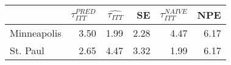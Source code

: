 
\begin{tabular}{lrrrrr}
\toprule
  & $\tau_{ITT}^{PRED}$ & $\hat{\tau_{ITT}}$ & SE & $\tau_{ITT}^{NAIVE}$ & NPE\\
\midrule
Minneapolis & 3.50 & 1.99 & 2.28 & 4.47 & 6.17\\
St. Paul & 2.65 & 4.47 & 3.32 & 1.99 & 6.17\\
\bottomrule
\end{tabular}